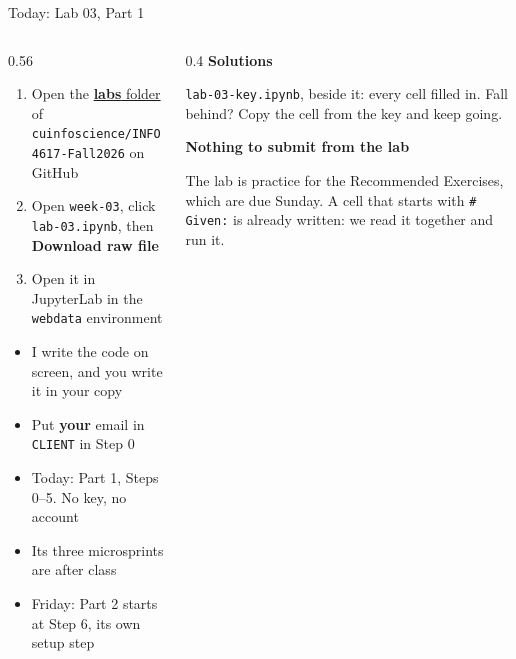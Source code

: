 \documentclass[9pt,aspectratio=169]{beamer}
\begin{document}
\begin{frame}{Today: Lab 03, Part 1}
    \begin{columns}[T]
        \begin{column}{0.56\textwidth}
            \begin{enumerate}\small
                \item Open the \href{https://github.com/cuinfoscience/INFO4617-Fall2026/tree/main/labs}{\textbf{labs} folder} of \texttt{cuinfoscience/INFO4617-Fall2026} on GitHub
                \item Open \texttt{week-03}, click \texttt{lab-03.ipynb}, then \textbf{Download raw file}
                \item Open it in JupyterLab in the \texttt{webdata} environment
            \end{enumerate}

            \medskip
            \begin{itemize}\small
                \item I write the code on screen, and you write it in your copy
                \item Put \textbf{your} email in \texttt{CLIENT} in Step 0
                \item Today: Part 1, Steps 0--5. No key, no account
                \item Its three microsprints are after class
                \item Friday: Part 2 starts at Step 6, its own setup step
            \end{itemize}
        \end{column}
        \begin{column}{0.4\textwidth}
            \textbf{Solutions}\\[2pt]
            {\footnotesize \texttt{lab-03-key.ipynb}, beside it: every cell filled in. Fall behind? Copy the cell from the key and keep going.\par}
            \medskip
            \textbf{Nothing to submit from the lab}\\[2pt]
            {\footnotesize The lab is practice for the Recommended Exercises, which are due Sunday. A cell that starts with \texttt{\# Given:} is already written: we read it together and run it.\par}
        \end{column}
    \end{columns}
\end{frame}
\end{document}
